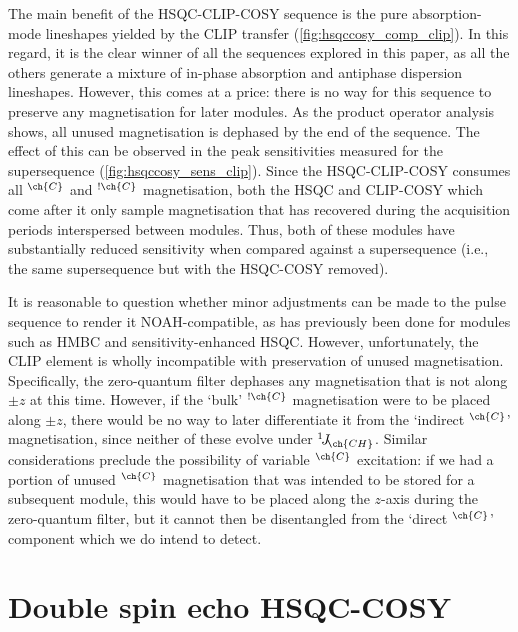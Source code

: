 \documentclass[a4paper,12pt]{article}
\newcommand{\magn}[1]{\ch{^1H}$^{\ch{#1}}$}
\newcommand{\magnnot}[1]{\ch{^1H}$^{!\ch{#1}}$}
\newcommand{\oneJ}[1]{{}^{1}\!J_{\!\ch{#1}}}
\begin{document}
\begin{refsection}
The main benefit of the HSQC-CLIP-COSY sequence is the pure absorption-mode lineshapes yielded by the CLIP transfer (\cref{fig:hsqccosy_comp_clip}).
In this regard, it is the clear winner of all the sequences explored in this paper, as all the others generate a mixture of in-phase absorption and antiphase dispersion lineshapes.
However, this comes at a price: there is no way for this sequence to preserve any magnetisation for later modules.
As the product operator analysis shows, all unused magnetisation is dephased by the end of the sequence.
The effect of this can be observed in the peak sensitivities measured for the  supersequence (\cref{fig:hsqccosy_sens_clip}).
Since the HSQC-CLIP-COSY consumes all \magn{C} and \magnnot{C} magnetisation, both the HSQC and CLIP-COSY which come after it only sample magnetisation that has recovered during the acquisition periods interspersed between modules.
Thus, both of these modules have substantially reduced sensitivity when compared against a  supersequence (i.e., the same supersequence but with the HSQC-COSY removed).

It is reasonable to question whether minor adjustments can be made to the pulse sequence to render it NOAH-compatible, as has previously been done for modules such as HMBC\autocite{Claridge2019MRC,Kupce2019JMR} and sensitivity-enhanced HSQC\autocite{Hansen2021AC,Yong2021JMR}.
However, unfortunately, the CLIP element is wholly incompatible with preservation of unused magnetisation.
Specifically, the zero-quantum filter dephases any magnetisation that is not along $\pm z$ at this time.
However, if the `bulk' \magnnot{C} magnetisation were to be placed along $\pm z$, there would be no way to later differentiate it from the `indirect \magn{C}' magnetisation, since neither of these evolve under $\oneJ{CH}$.
Similar considerations preclude the possibility of variable \magn{C} excitation: if we had a portion of unused \magn{C} magnetisation that was intended to be stored for a subsequent module, this would have to be placed along the $z$-axis during the zero-quantum filter, but it cannot then be disentangled from the `direct \magn{C}' component which we do intend to detect.

\section{Double spin echo HSQC-COSY}


\end{refsection}
\end{document}
